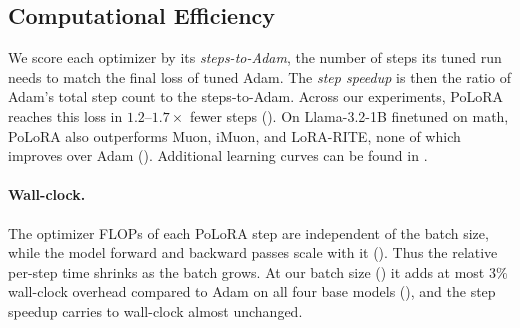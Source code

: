 \documentclass[11pt]{article}
\newcommand{\methodname}{PoLoRA\xspace}
\begin{document}
\subsection{Computational Efficiency}
\label{sec:exp-main}
We score each optimizer by its \emph{steps-to-Adam}, the number of steps its tuned run needs to match the final loss of tuned Adam. The \emph{step speedup} is then the ratio of Adam's total step count to the steps-to-Adam. Across our experiments, \methodname{} reaches this loss in $1.2$--$1.7\times$ fewer steps (). On Llama-3.2-1B finetuned on math, \methodname{} also outperforms Muon, iMuon, and LoRA-RITE, none of which improves over Adam (). Additional learning curves can be found in .



\paragraph{Wall-clock.}\label{sec:exp-walltime} The optimizer FLOPs of each \methodname{} step are independent of the batch size, while the model forward
and backward passes scale with it (). Thus the relative per-step time shrinks
as the batch grows. At our batch size () it adds at most $3\%$ wall-clock overhead compared to Adam on
all four base models (), and the step speedup carries to wall-clock almost
unchanged.  
\end{document}
